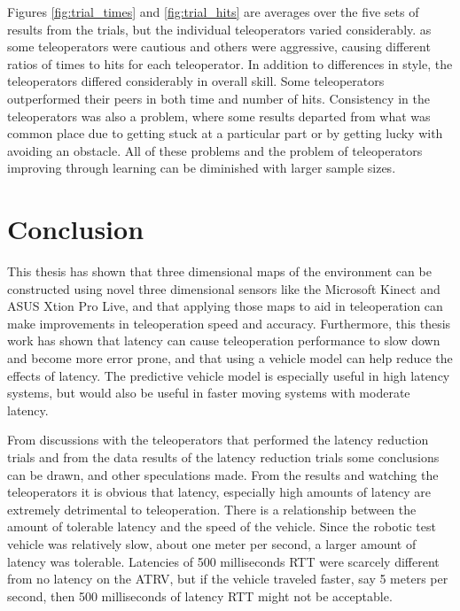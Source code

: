 \documentclass[12pt]{report}
\begin{document}
Figures \ref{fig:trial_times} and \ref{fig:trial_hits} are averages over the five sets of results from the trials, but the individual teleoperators varied considerably. as some teleoperators were cautious and others were aggressive, causing different ratios of times to hits for each teleoperator.  In addition to differences in style, the teleoperators differed considerably in overall skill.  Some teleoperators outperformed their peers in both time and number of hits.  Consistency in the teleoperators was also a problem, where some results departed from what was common place due to getting stuck at a particular part or by getting lucky with avoiding an obstacle.  All of these problems and the problem of teleoperators improving through learning can be diminished with larger sample sizes.


\chapter{Conclusion}\label{chap:conclusion}
This thesis has shown that three dimensional maps of the environment can be constructed using novel three dimensional sensors like the Microsoft Kinect and ASUS Xtion Pro Live, and that applying those maps to aid in teleoperation can make improvements in teleoperation speed and accuracy.  Furthermore, this thesis work has shown that latency can cause teleoperation performance to slow down and become more error prone, and that using a vehicle model can help reduce the effects of latency.  The predictive vehicle model is especially useful in high latency systems, but would also be useful in faster moving systems with moderate latency.

From discussions with the teleoperators that performed the latency reduction trials and from the data results of the latency reduction trials some conclusions can be drawn, and other speculations made.  From the results and watching the teleoperators it is obvious that latency, especially high amounts of latency are extremely detrimental to teleoperation.  There is a relationship between the amount of tolerable latency and the speed of the vehicle.  Since the robotic test vehicle was relatively slow, about one meter per second, a larger amount of latency was tolerable.  Latencies of 500 milliseconds RTT were scarcely different from no latency on the ATRV, but if the vehicle traveled faster, say 5 meters per second, then 500 milliseconds of latency RTT might not be acceptable.
\end{document}
